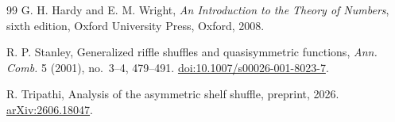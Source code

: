 \documentclass[11pt]{article}
\theoremstyle{definition}
\theoremstyle{remark}
\begin{document}
\begin{thebibliography}{99}
G. H. Hardy and E. M. Wright,
\newblock \emph{An Introduction to the Theory of Numbers},
\newblock sixth edition, Oxford University Press, Oxford, 2008.

R. P. Stanley,
\newblock Generalized riffle shuffles and quasisymmetric functions,
\newblock \emph{Ann. Comb.} 5 (2001), no.~3--4, 479--491.
\newblock \href{https://doi.org/10.1007/s00026-001-8023-7}
{doi:10.1007/s00026-001-8023-7}.

R. Tripathi,
\newblock Analysis of the asymmetric shelf shuffle,
\newblock preprint, 2026.
\newblock \href{https://arxiv.org/abs/2606.18047}{arXiv:2606.18047}.

\end{thebibliography}
\end{document}
